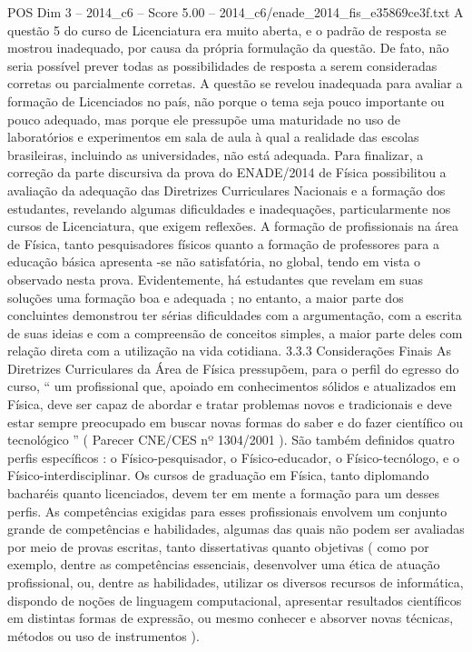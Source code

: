 \begin{textsample}{POS Dim 3 – 2014\_c6 – Score 5.00 – 2014\_c6/enade\_2014\_fis\_e35869ce3f.txt}
A questão 5 do curso de Licenciatura era muito aberta, e o padrão de resposta se mostrou inadequado, por causa da própria formulação da questão.
De fato, não seria possível prever todas as possibilidades de resposta a serem consideradas corretas ou parcialmente corretas.
A questão se revelou inadequada para avaliar a formação de Licenciados no país, não porque o tema seja pouco importante ou pouco adequado, mas porque ele pressupõe uma maturidade no uso de laboratórios e experimentos em sala de aula à qual a realidade das escolas brasileiras, incluindo as universidades, não está adequada.
Para finalizar, a correção da parte discursiva da prova do ENADE/2014 de Física possibilitou a avaliação da adequação das Diretrizes Curriculares Nacionais e a formação dos estudantes, revelando algumas dificuldades e inadequações, particularmente nos cursos de Licenciatura, que exigem reflexões.
A formação de profissionais na área de Física, tanto pesquisadores físicos quanto a formação de professores para a educação básica apresenta -se não satisfatória, no global, tendo em vista o observado nesta prova.
Evidentemente, há estudantes que revelam em suas soluções uma formação boa e adequada ; no entanto, a maior parte dos concluintes demonstrou ter sérias dificuldades com a argumentação, com a escrita de suas ideias e com a compreensão de conceitos simples, a maior parte deles com relação direta com a utilização na vida cotidiana. 3.3.3 Considerações Finais As Diretrizes Curriculares da Área de Física pressupõem, para o perfil do egresso do curso, “ um profissional que, apoiado em conhecimentos sólidos e atualizados em Física, deve ser capaz de abordar e tratar problemas novos e tradicionais e deve estar sempre preocupado em buscar novas formas do saber e do fazer científico ou tecnológico ” ( Parecer CNE/CES nº 1304/2001 ).
São também definidos quatro perfis específicos : o Físico-pesquisador, o Físico-educador, o Físico-tecnólogo, e o Físico-interdisciplinar.
Os cursos de graduação em Física, tanto diplomando bacharéis quanto licenciados, devem ter em mente a formação para um desses perfis.
As competências exigidas para esses profissionais envolvem um conjunto grande de competências e habilidades, algumas das quais não podem ser avaliadas por meio de provas escritas, tanto dissertativas quanto objetivas ( como por exemplo, dentre as competências essenciais, desenvolver uma ética de atuação profissional, ou, dentre as habilidades, utilizar os diversos recursos de informática, dispondo de noções de linguagem computacional, apresentar resultados científicos em distintas formas de expressão, ou mesmo conhecer e absorver novas técnicas, métodos ou uso de instrumentos ).

\end{textsample}
